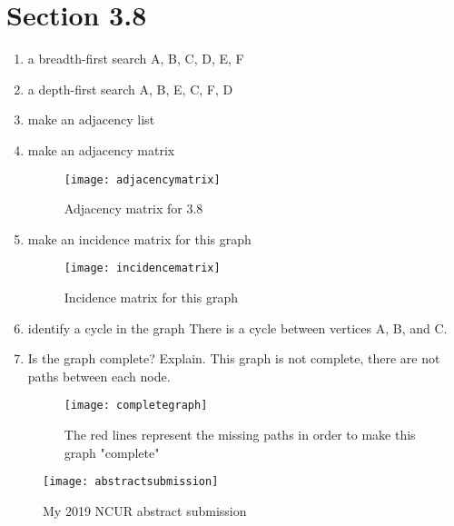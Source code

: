 \documentclass[11pt]{article}
\begin{document}
\section*{Section 3.8}
\begin{enumerate}
    \item a breadth-first search \newline
    A, B, C, D, E, F
    
    \item a depth-first search \newline
    A, B, E, C, F, D
    
    \item make an adjacency list
    
    \item make an adjacency matrix
    \begin{figure}
        \centering
        \texttt{[image: adjacencymatrix]}
        \caption{Adjacency matrix for 3.8}
        \label{fig:my_label}
    \end{figure}
    \item make an incidence matrix for this graph
    \begin{figure}
        \centering
        \texttt{[image: incidencematrix]}
        \caption{Incidence matrix for this graph}
        \label{fig:my_label}
    \end{figure}
    
    \item identify a cycle in the graph \newline
    There is a cycle between vertices A, B, and C.
    
    \item Is the graph complete? Explain. \newline
    This graph is not complete, there are not paths between each node.
    
    \begin{figure}
        \centering
        \texttt{[image: completegraph]}
        \caption{The red lines represent the missing paths in order to make this graph "complete"}
        \label{fig:my_label}
    \end{figure}
\end{enumerate}

\begin{figure}
    \centering
    \texttt{[image: abstractsubmission]}
    \caption{My 2019 NCUR abstract submission}
    \label{fig:my_label}
\end{figure}
\end{document}
